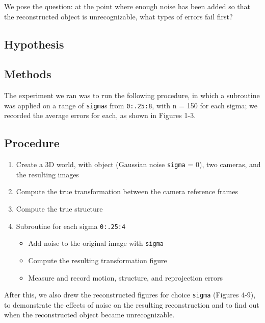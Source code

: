 \documentclass{article}
\begin{document}
We pose the question: at the point where enough noise has been added so that the reconstructed object is unrecognizable, what types of errors fail first?


\subsection{Hypothesis}


\subsection{Methods}

The experiment we ran was to run the following procedure, in which a subroutine was applied on a range of \texttt{sigma}s from \texttt{0:.25:8}, with n = 150 for each sigma; we recorded the average errors for each, as shown in Figures 1-3.

\subsection*{Procedure}

\begin{enumerate}
  \item Create a 3D world, with object (Gaussian noise \texttt{sigma} = 0), two cameras, and the resulting images
  \item Compute the true transformation between the camera reference frames
  \item Compute the true structure
  \item Subroutine for each sigma \texttt{0:.25:4}
  \begin{itemize}
  	\item Add noise to the original image with \texttt{sigma}
  	\item Compute the resulting transformation figure
  	\item Measure and record motion, structure, and reprojection errors
  \end{itemize}
\end{enumerate} 

After this, we also drew the reconstructed figures for choice \texttt{sigma} (Figures 4-9), to demonstrate the effects of noise on the resulting reconstruction and to find out when the reconstructed object became unrecognizable.

\end{document}
